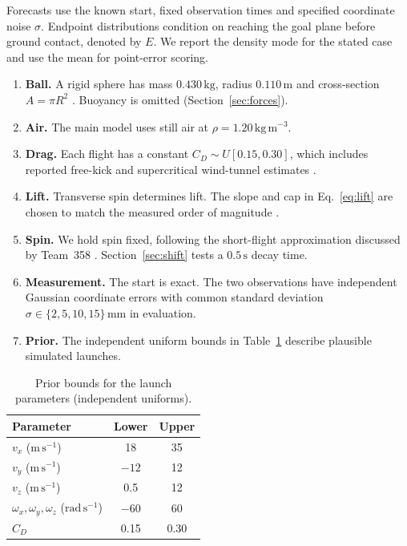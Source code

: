 \documentclass[11pt,a4paper]{article}
\begin{document}
Forecasts use the known start, fixed observation times and specified coordinate noise $\sigma$. Endpoint distributions condition on reaching the goal plane before ground contact, denoted by $E$. We report the density mode for the stated case and use the mean for point-error scoring.

\begin{enumerate}
  \item[\textbf{A1.}] \textbf{Ball.} A rigid sphere has mass $0.430\,\mathrm{kg}$, radius $0.110\,\mathrm{m}$ and cross-section $A=\pi R^2$ \cite{ifab}. Buoyancy is omitted (Section~\ref{sec:forces}).
  \item[\textbf{A2.}] \textbf{Air.} The main model uses still air at $\rho=1.20\,\mathrm{kg\,m^{-3}}$.
  \item[\textbf{A3.}] \textbf{Drag.} Each flight has a constant $C_D\sim U[0.15,0.30]$, which includes reported free-kick and supercritical wind-tunnel estimates \cite{bray2003,asai2007}.
  \item[\textbf{A4.}] \textbf{Lift.} Transverse spin determines lift. The slope and cap in Eq.~\eqref{eq:lift} are chosen to match the measured order of magnitude \cite{goff2010,asai2007}.
  \item[\textbf{A5.}] \textbf{Spin.} We hold spin fixed, following the short-flight approximation discussed by Team~358 \cite{team358}. Section~\ref{sec:shift} tests a $0.5\,\mathrm{s}$ decay time.
  \item[\textbf{A6.}] \textbf{Measurement.} The start is exact. The two observations have independent Gaussian coordinate errors with common standard deviation $\sigma\in\{2,5,10,15\}\,\mathrm{mm}$ in evaluation.
  \item[\textbf{A7.}] \textbf{Prior.} The independent uniform bounds in Table~\ref{tab:prior} describe plausible simulated launches.
\end{enumerate}

\begin{table}[htbp]
  \centering
  \caption{Prior bounds for the launch parameters (independent uniforms).}
  \label{tab:prior}
  \begin{tabular}{lcc}
    \toprule
    Parameter & Lower & Upper \\
    \midrule
    $v_x$ ($\mathrm{m\,s^{-1}}$) & 18 & 35 \\
    $v_y$ ($\mathrm{m\,s^{-1}}$) & $-12$ & 12 \\
    $v_z$ ($\mathrm{m\,s^{-1}}$) & 0.5 & 12 \\
    $\omega_x,\omega_y,\omega_z$ ($\mathrm{rad\,s^{-1}}$) & $-60$ & 60 \\
    $C_D$ & 0.15 & 0.30 \\
    \bottomrule
  \end{tabular}
\end{table}
\end{document}
